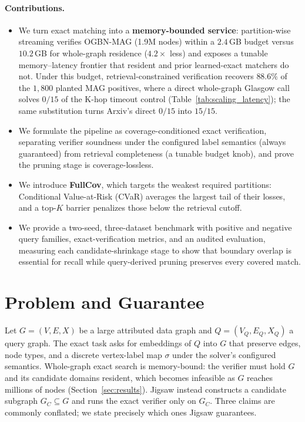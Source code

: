 \documentclass[sigconf, nonacm]{acmart}
\begin{document}
\paragraph{Contributions.}
\begin{itemize}
    \item We turn exact matching into a \textbf{memory-bounded service}: partition-wise streaming verifies OGBN-MAG (1.9M nodes) within a $2.4$\,GB budget versus $10.2$\,GB for whole-graph residence ($4.2\times$ less) and exposes a tunable memory--latency frontier that resident and prior learned-exact matchers do not. Under this budget, retrieval-constrained verification recovers $88.6\%$ of the $1{,}800$ planted MAG positives, where a direct whole-graph Glasgow call solves $0/15$ of the K-hop timeout control (Table~\ref{tab:scaling_latency}); the same substitution turns Arxiv's direct $0/15$ into $15/15$.
    \item We formulate the pipeline as coverage-conditioned exact verification, separating verifier soundness under the configured label semantics (always guaranteed) from retrieval completeness (a tunable budget knob), and prove the pruning stage is coverage-lossless.
    \item We introduce \textbf{FullCov}, which targets the weakest required partitions: Conditional Value-at-Risk (CVaR) averages the largest tail of their losses, and a top-$K$ barrier penalizes those below the retrieval cutoff.
    \item We provide a two-seed, three-dataset benchmark with positive and negative query families, exact-verification metrics, and an audited evaluation, measuring each candidate-shrinkage stage to show that boundary overlap is essential for recall while query-derived pruning preserves every covered match.
\end{itemize}

\section{Problem and Guarantee}
\label{sec:problem}

Let $G=(V,E,X)$ be a large attributed data graph and $Q=(V_Q,E_Q,X_Q)$ a query graph. The exact task asks for embeddings of $Q$ into $G$ that preserve edges, node types, and a discrete vertex-label map $\sigma$ under the solver's configured semantics. Whole-graph exact search is memory-bound: the verifier must hold $G$ and its candidate domains resident, which becomes infeasible as $G$ reaches millions of nodes (Section~\ref{sec:results}). Jigsaw instead constructs a candidate subgraph $G_C\subseteq G$ and runs the exact verifier only on $G_C$. Three claims are commonly conflated; we state precisely which ones Jigsaw guarantees.
\end{document}
